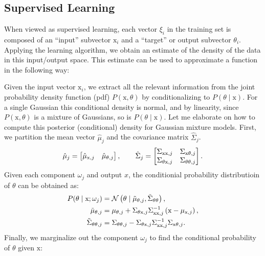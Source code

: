 \subsection{Supervised Learning}
%
When viewed as supervised learning, each vector $\xi_i$ in the training set is
composed of an ``input'' subvector $\mathrm{x}_i$ and a ``target'' or output
subvector $\theta_i$. Applying the learning algorithm, we obtain an estimate of
the density of the data in this input/output space. This estimate can be used to
approximate a function in the following way:

Given the input vector $\mathrm{x}_i$, we extract all the relevant information
from the joint probability density function (pdf) $P(\mathrm{x}, \theta)$ by
conditionalizing to $P(\theta \mid \mathrm{x})$. For a single Gaussian this
conditional density is normal, and by linearity, since $P(\mathrm{x}, \theta)$
is a mixture of Gaussians, so is $P(\theta \mid \mathrm{x})$. Let me elaborate
on how to compute this posterior (conditional) density for Gaussian mixture
models. First, we partition the mean vector $\hat{\mu}_j$ and the covariance
matrix $\hat{\Sigma}_j$.
%
\begin{equation}
    \hat{\mu}_j = \begin{bmatrix}\hat{\mu}_{\mathrm{x},j} & \hat{\mu}_{\theta,j}\end{bmatrix}, \qquad
    \hat{\Sigma}_j = \begin{bmatrix}
        \Sigma_{\mathrm{xx}, j} & \Sigma_{\mathrm{x}\theta, j} \\
        \Sigma_{\theta\mathrm{x}, j} & \Sigma_{\theta\theta, j}
    \end{bmatrix}.
    \label{eq:partition}
\end{equation}
%
Given each component $\omega_j$ and output $x$, the conditionial probability 
distributioin of $\theta$ can be obtained as:
%
\begin{align}
    \begin{split}
    P(\theta \mid \mathrm{x}; \omega_j) &= \mathcal{N}\left( \theta \mid \tilde{\mu}_{\theta,j}, \tilde{\Sigma}_{\theta\theta} \right), \\
    \tilde{\mu}_{\theta, j} &=  \mu_{\theta, j} + \Sigma_{\theta\mathrm{x}, j}\Sigma_{\mathrm{xx}, j}^{-1} \left( \mathrm{x} - \mu_{\mathrm{x},j} \right), \\
    \tilde{\Sigma}_{\theta\theta, j} &= \Sigma_{\theta\theta, j} - \Sigma_{\theta\mathrm{x}, j}\Sigma_{\mathrm{xx}, j}^{-1}\Sigma_{\mathrm{x}\theta, j}.
    \end{split}
    \label{eq:posterior_each_comp}
\end{align}
%
Finally, we marginalize out the component $\omega_j$ to find the conditional 
probability of $\theta$ given $\mathrm{x}$:
